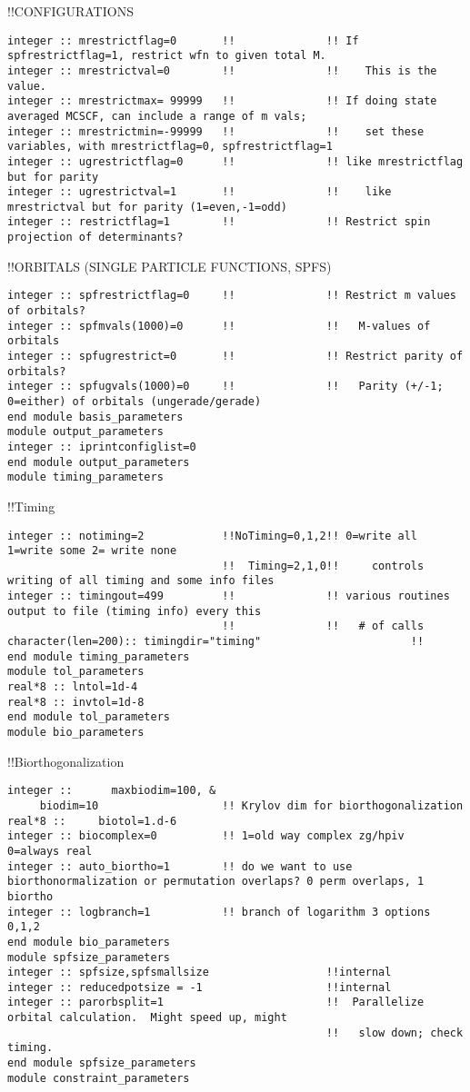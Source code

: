 !!{\large \quad CONFIGURATIONS}
\begin{verbatim}
integer :: mrestrictflag=0       !!              !! If spfrestrictflag=1, restrict wfn to given total M.
integer :: mrestrictval=0        !!              !!    This is the value.
integer :: mrestrictmax= 99999   !!              !! If doing state averaged MCSCF, can include a range of m vals;
integer :: mrestrictmin=-99999   !!              !!    set these variables, with mrestrictflag=0, spfrestrictflag=1
integer :: ugrestrictflag=0      !!              !! like mrestrictflag but for parity
integer :: ugrestrictval=1       !!              !!    like mrestrictval but for parity (1=even,-1=odd)
integer :: restrictflag=1        !!              !! Restrict spin projection of determinants?
\end{verbatim}
!!{\large \quad ORBITALS (SINGLE PARTICLE FUNCTIONS, SPFS)}
\begin{verbatim}
integer :: spfrestrictflag=0     !!              !! Restrict m values of orbitals?  
integer :: spfmvals(1000)=0      !!              !!   M-values of orbitals 
integer :: spfugrestrict=0       !!              !! Restrict parity of orbitals? 
integer :: spfugvals(1000)=0     !!              !!   Parity (+/-1; 0=either) of orbitals (ungerade/gerade)
end module basis_parameters
module output_parameters
integer :: iprintconfiglist=0
end module output_parameters
module timing_parameters
\end{verbatim}
!!{\large \quad Timing}
\begin{verbatim}
integer :: notiming=2            !!NoTiming=0,1,2!! 0=write all 1=write some 2= write none
                                 !!  Timing=2,1,0!!     controls writing of all timing and some info files
integer :: timingout=499         !!              !! various routines output to file (timing info) every this 
                                 !!              !!   # of calls
character(len=200):: timingdir="timing"                       !!
end module timing_parameters
module tol_parameters
real*8 :: lntol=1d-4
real*8 :: invtol=1d-8
end module tol_parameters
module bio_parameters
\end{verbatim}
!!{\large \quad Biorthogonalization }
\begin{verbatim}
integer ::      maxbiodim=100, &
     biodim=10                   !! Krylov dim for biorthogonalization
real*8 ::     biotol=1.d-6
integer :: biocomplex=0          !! 1=old way complex zg/hpiv  0=always real
integer :: auto_biortho=1        !! do we want to use biorthonormalization or permutation overlaps? 0 perm overlaps, 1 biortho
integer :: logbranch=1           !! branch of logarithm 3 options 0,1,2
end module bio_parameters
module spfsize_parameters
integer :: spfsize,spfsmallsize                  !!internal
integer :: reducedpotsize = -1                   !!internal
integer :: parorbsplit=1                         !!  Parallelize orbital calculation.  Might speed up, might
                                                 !!   slow down; check timing.
end module spfsize_parameters
module constraint_parameters
\end{verbatim}
